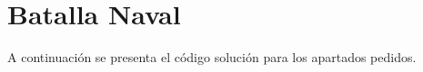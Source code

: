 \section{Batalla Naval}

  A continuación se presenta el código solución
  para los apartados pedidos.
  
  